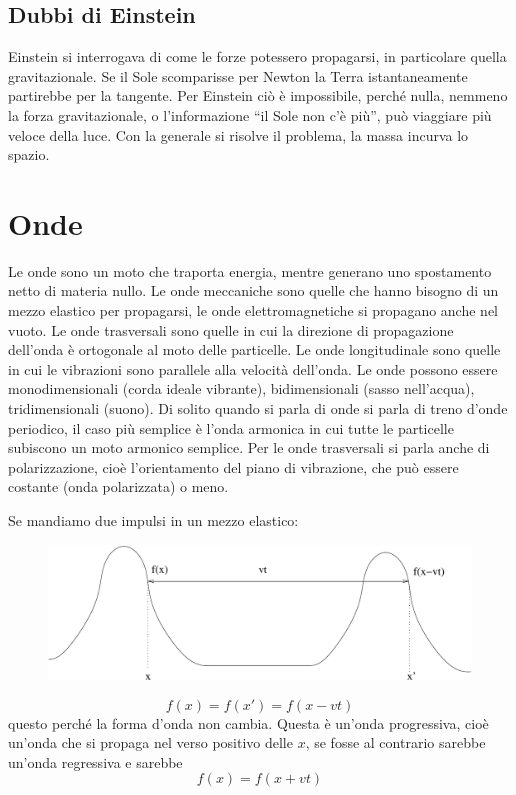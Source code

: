 \section{Dubbi di Einstein}
Einstein si interrogava di come le forze potessero propagarsi, in particolare quella gravitazionale. Se il Sole scomparisse per Newton la Terra istantaneamente partirebbe per la tangente. Per Einstein ciò è impossibile, perché nulla, nemmeno la forza gravitazionale, o l'informazione ``il Sole non c'è più'', può viaggiare più veloce della luce. Con la generale si risolve il problema, la massa incurva lo spazio.

\chapter{Onde}
Le onde sono un moto che traporta energia, mentre generano uno spostamento netto di materia nullo. Le onde meccaniche sono quelle che hanno bisogno di un mezzo elastico per propagarsi, le onde elettromagnetiche si propagano anche nel vuoto. Le onde trasversali sono quelle in cui la direzione di propagazione dell'onda è ortogonale al moto delle particelle. Le onde longitudinale sono quelle in cui le vibrazioni sono parallele alla velocità dell'onda. Le onde possono essere monodimensionali (corda ideale vibrante), bidimensionali (sasso nell'acqua), tridimensionali (suono). Di solito quando si parla di onde si parla di treno d'onde periodico, il caso più semplice è l'onda armonica in cui tutte le particelle subiscono un moto armonico semplice. Per le onde trasversali si parla anche di polarizzazione, cioè l'orientamento del piano di vibrazione, che può essere costante (onda polarizzata) o meno.

Se mandiamo due impulsi in un mezzo elastico:
\begin{figure}[htbp]
   \centering
   \includegraphics[scale=0.5]{immagini/fisica1/Onda1}
\end{figure}
\begin{equation*}f(x)=f(x')=f(x-vt)\end{equation*}
questo perché la forma d'onda non cambia. Questa è un'onda progressiva, cioè un'onda che si propaga nel verso positivo delle $x$, se fosse al contrario sarebbe un'onda regressiva e sarebbe
\begin{equation*}f(x)=f(x+vt)\end{equation*}
